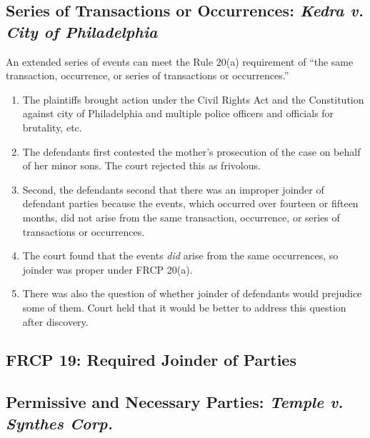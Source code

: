 
\subsection{Series of Transactions or Occurrences: \emph{Kedra v. City of 
Philadelphia}}

An extended series of events can meet the Rule 20(a) requirement of ``the same 
transaction, occurrence, or series of transactions or occurrences.''

\begin{enumerate}
    \item The plaintiffs brought action under the Civil Rights Act and the 
    Constitution against city of Philadelphia and multiple police officers and 
    officials for brutality, etc.
    \item The defendants first contested the mother's prosecution of the case 
    on behalf of her minor sons. The court rejected this as frivolous.
    \item Second, the defendants second that there was an improper joinder of 
    defendant parties because the events, which occurred over fourteen or 
    fifteen months, did not arise from the same transaction, occurrence, or 
    series of transactions or occurrences.
    \item The court found that the events \emph{did} arise from the same 
    occurrences, so joinder was proper under FRCP 20(a).
    \item There was also the question of whether joinder of defendants would 
    prejudice some of them. Court held that it would be better to address this 
    question after discovery.
\end{enumerate}

\subsection{FRCP 19: Required Joinder of Parties}


\subsection{Permissive and Necessary Parties: \emph{Temple v. Synthes Corp.}}

